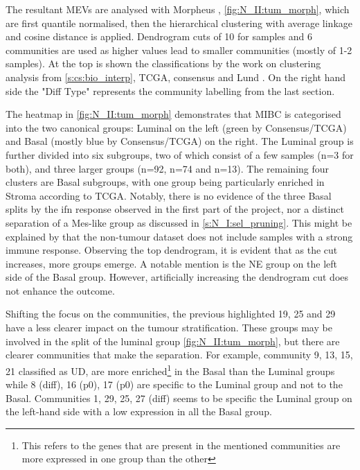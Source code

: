 The resultant MEVs are analysed with Morpheus \citep{Broad-Institute2016-tn}, \cref{fig:N_II:tum_morph}, which are first quantile normalised, then the hierarchical clustering with average linkage and cosine distance is applied. Dendrogram cuts of 10 for samples and 6 communities are used as higher values lead to smaller communities (mostly of 1-2 samples). At the top is shown the classifications by the work on clustering analysis from \cref{s:cs:bio_interp}, TCGA, consensus and Lund \citep{Robertson2017-mg,Kamoun2020-tj,Marzouka2018-ge}. On the right hand side the "Diff Type" represents the community labelling from the last section.

The heatmap in \cref{fig:N_II:tum_morph} demonstrates that MIBC is categorised into the two canonical groups: Luminal on the left (green by Consensus/TCGA) and Basal (mostly blue by Consensus/TCGA) on the right. The Luminal group is further divided into six subgroups, two of which consist of a few samples (n=3 for both), and three larger groups (n=92, n=74 and n=13). The remaining four clusters are Basal subgroups, with one group being particularly enriched in Stroma according to TCGA. Notably, there is no evidence of the three Basal splits by the \acrfull{ifn} response observed in the first part of the project, nor a distinct separation of a Mes-like group as discussed in \cref{s:N_I:sel_pruning}. This might be explained by that the non-tumour dataset does not include samples with a strong immune response. Observing the top dendrogram, it is evident that as the cut increases, more groups emerge. A notable mention is the NE group on the left side of the Basal group. However, artificially increasing the dendrogram cut does not enhance the outcome.

Shifting the focus on the communities, the previous highlighted 19, 25 and 29 have a less clearer impact on the tumour stratification. These groups may be involved in the split of the luminal group \cref{fig:N_II:tum_morph}, but there are clearer communities that make the separation. For example, community 9, 13, 15, 21 classified as UD, are more enriched\footnote{This refers to the genes that are present in the mentioned communities are more expressed in one group than the other} in the Basal than the Luminal groups while 8 (diff), 16 (p0), 17 (p0) are specific to the Luminal group and not to the Basal. Communities 1, 29, 25, 27 (diff) seems to be specific the Luminal group on the left-hand side with a low expression in all the Basal group. 

